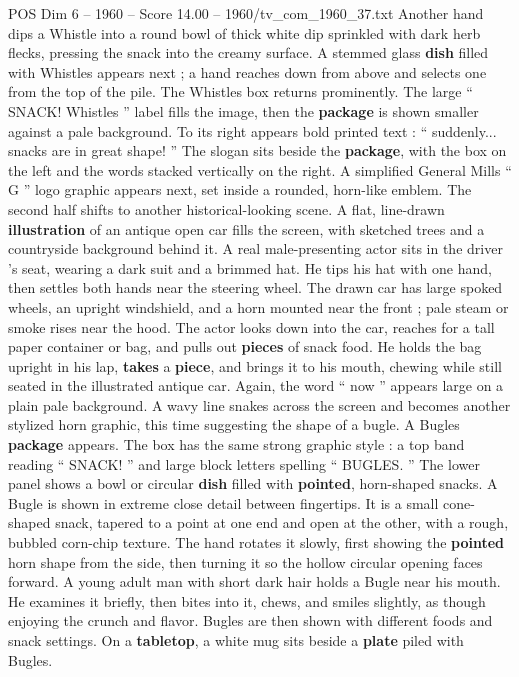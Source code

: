 \begin{textsample}{POS Dim 6 – 1960 – Score 14.00 – 1960/tv\_com\_1960\_37.txt}
Another hand dips a Whistle into a round bowl of thick white dip sprinkled with dark herb flecks, pressing the snack into the creamy surface.
A stemmed glass \textbf{dish} filled with Whistles appears next ; a hand reaches down from above and selects one from the top of the pile.
The Whistles box returns prominently.
The large “ SNACK!
Whistles ” label fills the image, then the \textbf{package} is shown smaller against a pale background.
To its right appears bold printed text : “ suddenly... snacks are in great shape! ” The slogan sits beside the \textbf{package}, with the box on the left and the words stacked vertically on the right.
A simplified General Mills “ G ” logo graphic appears next, set inside a rounded, horn-like emblem.
The second half shifts to another historical-looking scene.
A flat, line-drawn \textbf{illustration} of an antique open car fills the screen, with sketched trees and a countryside background behind it.
A real male-presenting actor sits in the driver ’s seat, wearing a dark suit and a brimmed hat.
He tips his hat with one hand, then settles both hands near the steering wheel.
The drawn car has large spoked wheels, an upright windshield, and a horn mounted near the front ; pale steam or smoke rises near the hood.
The actor looks down into the car, reaches for a tall paper container or bag, and pulls out \textbf{pieces} of snack food.
He holds the bag upright in his lap, \textbf{takes} a \textbf{piece}, and brings it to his mouth, chewing while still seated in the illustrated antique car.
Again, the word “ now ” appears large on a plain pale background.
A wavy line snakes across the screen and becomes another stylized horn graphic, this time suggesting the shape of a bugle.
A Bugles \textbf{package} appears.
The box has the same strong graphic style : a top band reading “ SNACK! ” and large block letters spelling “ BUGLES. ” The lower panel shows a bowl or circular \textbf{dish} filled with \textbf{pointed}, horn-shaped snacks.
A Bugle is shown in extreme close detail between fingertips.
It is a small cone-shaped snack, tapered to a point at one end and open at the other, with a rough, bubbled corn-chip texture.
The hand rotates it slowly, first showing the \textbf{pointed} horn shape from the side, then turning it so the hollow circular opening faces forward.
A young adult man with short dark hair holds a Bugle near his mouth.
He examines it briefly, then bites into it, chews, and smiles slightly, as though enjoying the crunch and flavor.
Bugles are then shown with different foods and snack settings.
On a \textbf{tabletop}, a white mug sits beside a \textbf{plate} piled with Bugles.

\end{textsample}
